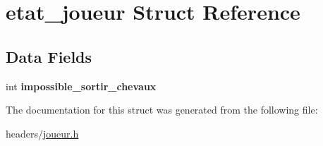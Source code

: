 \hypertarget{structetat__joueur}{}\section{etat\+\_\+joueur Struct Reference}
\label{structetat__joueur}
\subsection*{Data Fields}
\begin{DoxyCompactItemize}
\item 
\mbox{\label{structetat__joueur_a561c5b720f121e1467dbf80d3384bd8b}} 
int {\bfseries impossible\+\_\+sortir\+\_\+chevaux}
\end{DoxyCompactItemize}


The documentation for this struct was generated from the following file\+:\begin{DoxyCompactItemize}
\item 
headers/\mbox{\hyperlink{joueur_8h}{joueur.\+h}}\end{DoxyCompactItemize}
